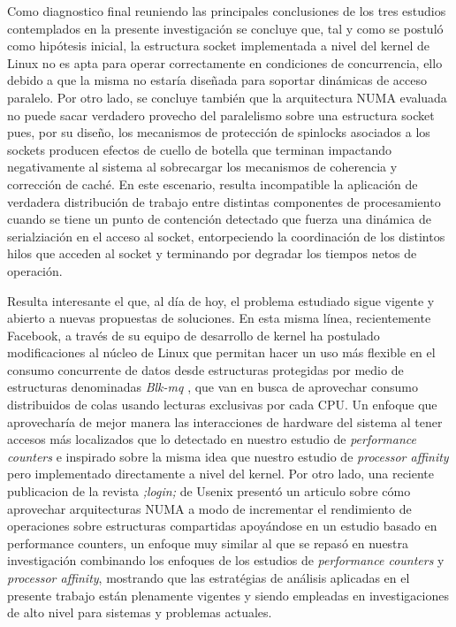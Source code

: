 \begin{conclusion}
 
Como diagnostico final reuniendo las principales conclusiones de los tres estudios contemplados en la presente investigación se concluye que, tal y como se postuló como hipótesis inicial, la estructura socket implementada a nivel del kernel de Linux no es apta para operar correctamente en condiciones de concurrencia, ello debido a que la misma no estaría diseñada para soportar dinámicas de acceso paralelo. Por otro lado, se concluye también que la arquitectura NUMA evaluada no puede sacar verdadero provecho del paralelismo sobre una estructura socket pues, por su diseño, los mecanismos de protección de spinlocks asociados a los sockets producen efectos de cuello de botella que terminan impactando negativamente al sistema al sobrecargar los mecanismos de coherencia y corrección de caché. En este escenario, resulta incompatible la aplicación de verdadera distribución de trabajo entre distintas componentes de procesamiento cuando se tiene un punto de contención detectado que fuerza una dinámica de serialziación en el acceso al socket, entorpeciendo la coordinación de los distintos hilos que acceden al socket y terminando por degradar los tiempos netos de operación. 
 
 
Resulta interesante el que, al día de hoy, el problema estudiado sigue vigente y abierto a nuevas propuestas de soluciones. En esta misma línea, recientemente Facebook, a través de su equipo de desarrollo de kernel ha postulado modificaciones al núcleo de Linux que permitan hacer un uso más flexible en el consumo concurrente de datos desde estructuras protegidas por medio de estructuras denominadas \emph{Blk-mq} \cite{post:facebookFin}, que van en busca de aprovechar consumo distribuidos de colas usando lecturas exclusivas por cada CPU. Un enfoque que aprovecharía de mejor manera las interacciones de hardware del sistema al tener accesos más localizados que lo detectado en nuestro estudio de \emph{performance counters} e inspirado sobre la misma idea que nuestro estudio de \emph{processor affinity} pero implementado directamente a nivel del kernel. Por otro lado, una reciente publicacion de la revista \emph{;login;} de Usenix \cite{magazine:login} presentó un articulo sobre cómo aprovechar arquitecturas NUMA a modo de incrementar el rendimiento de operaciones sobre estructuras compartidas apoyándose en un estudio basado en performance counters, un enfoque muy similar al que se repasó en nuestra investigación combinando los enfoques de los estudios de \emph{performance counters} y \emph{processor affinity}, mostrando que las estratégias de análisis aplicadas en el presente trabajo están plenamente vigentes y siendo empleadas en investigaciones de alto nivel para sistemas y problemas actuales. 
 

\end{conclusion}
